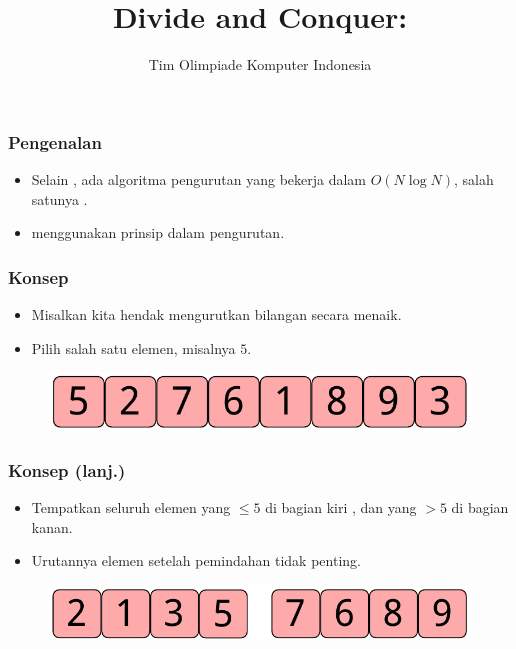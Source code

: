 

\title{Divide and Conquer:\newline \fQuickSort}
\author{Tim Olimpiade Komputer Indonesia}
\date{}



\begin{frame}
\titlepage
\end{frame}

\begin{frame}
\frametitle{Pengenalan}
\begin{itemize}
  \item Selain \fMergeSort, ada algoritma pengurutan yang bekerja dalam $O(N \log{N})$, salah satunya \fQuickSort.
  \item \fQuickSort menggunakan prinsip \fDivideAndConquer dalam pengurutan.
\end{itemize}
\end{frame}

\begin{frame}
\frametitle{Konsep}
\begin{itemize}
  \item Misalkan kita hendak mengurutkan \farray bilangan secara menaik.
  \item Pilih salah satu elemen, misalnya $5$.
\end{itemize}
\begin{figure}
  \centering
  \includegraphics[width=7 cm]{asset/quicksort-concept-1.pdf}
\end{figure}
\end{frame}

\begin{frame}
\frametitle{Konsep (lanj.)}
\begin{itemize}
  \item Tempatkan seluruh elemen yang $\leq 5$ di bagian kiri \farray, dan yang $> 5$ di bagian kanan.
  \item Urutannya elemen setelah pemindahan tidak penting.
\end{itemize}
\begin{figure}
  \centering
  \includegraphics[width=7 cm]{asset/quicksort-concept-2.pdf}
\end{figure}
\end{frame}

